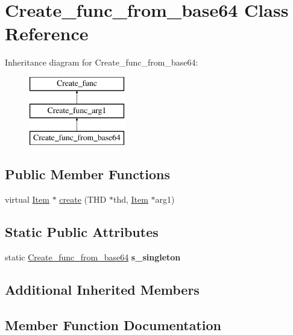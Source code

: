 \hypertarget{classCreate__func__from__base64}{}\section{Create\+\_\+func\+\_\+from\+\_\+base64 Class Reference}
\label{classCreate__func__from__base64}
Inheritance diagram for Create\+\_\+func\+\_\+from\+\_\+base64\+:\begin{figure}[H]
\begin{center}
\leavevmode
\includegraphics[height=3.000000cm]{classCreate__func__from__base64}
\end{center}
\end{figure}
\subsection*{Public Member Functions}
\begin{DoxyCompactItemize}
\item 
virtual \mbox{\hyperlink{classItem}{Item}} $\ast$ \mbox{\hyperlink{classCreate__func__from__base64_ace934a93be08c466fbde220fb2681117}{create}} (T\+HD $\ast$thd, \mbox{\hyperlink{classItem}{Item}} $\ast$arg1)
\end{DoxyCompactItemize}
\subsection*{Static Public Attributes}
\begin{DoxyCompactItemize}
\item 
\mbox{\label{classCreate__func__from__base64_ad807e972a23079a7acb685dcd0b4cb63}} 
static \mbox{\hyperlink{classCreate__func__from__base64}{Create\+\_\+func\+\_\+from\+\_\+base64}} {\bfseries s\+\_\+singleton}
\end{DoxyCompactItemize}
\subsection*{Additional Inherited Members}


\subsection{Member Function Documentation}
\mbox{\label{classCreate__func__from__base64_ace934a93be08c466fbde220fb2681117}} 
